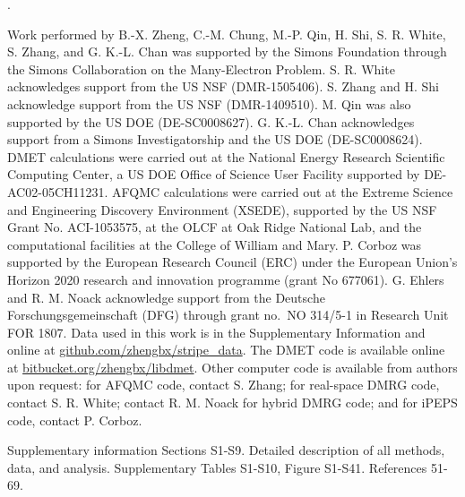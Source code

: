 \documentclass[12pt]{article}
\newcounter{lastnote}
\newenvironment{scilastnote}{%
\setcounter{lastnote}{\value{enumiv}}%
\addtocounter{lastnote}{+1}%
\begin{list}%
{\arabic{lastnote}.}
{\setlength{\leftmargin}{.22in}}
{\setlength{\labelsep}{.5em}}}
{\end{list}}
\begin{document}
\begin{scilastnote}
\item[] Work performed by B.-X. Zheng, C.-M. Chung,
  M.-P. Qin, H. Shi, S. R. White, 
  S. Zhang, and G. K.-L. Chan was supported by the Simons Foundation through the Simons Collaboration
  on the Many-Electron Problem. S. R. White acknowledges support from the US NSF (DMR-1505406).
  S. Zhang and H. Shi acknowledge support from the US NSF (DMR-1409510). M. Qin was also supported by the US DOE (DE-SC0008627).
  G. K.-L. Chan acknowledges support from a Simons Investigatorship and the US DOE (DE-SC0008624).
  DMET calculations were carried out at the National Energy Research Scientific Computing Center, a US DOE Office of Science User Facility   supported by DE-AC02-05CH11231.   AFQMC calculations were carried out at the Extreme Science and
  Engineering Discovery Environment (XSEDE), 
  supported by the US NSF Grant No. ACI-1053575, at the OLCF at Oak Ridge National Lab, and the computational facilities at the
  College of William and Mary. P. Corboz was supported by the European Research Council (ERC) under the
  European Union's Horizon 2020 research and innovation programme (grant No 
  677061).
  G. Ehlers and R. M. Noack acknowledge support
  from the Deutsche Forschungsgemeinschaft (DFG) through grant
  no.\  NO 314/5-1 in Research Unit FOR 1807. Data used in this work is in the Supplementary Information and online at \url{github.com/zhengbx/stripe_data}.
  The DMET code is available online at \url{bitbucket.org/zhengbx/libdmet}. Other computer code is available from authors upon request: for AFQMC code, contact
  S. Zhang; for real-space DMRG code, contact S. R. White; contact R. M. Noack for hybrid DMRG code; and for iPEPS code, contact P. Corboz.
\end{scilastnote}

 \bigskip

 Supplementary information Sections S1-S9. Detailed description
 of all methods, data, and analysis. Supplementary Tables S1-S10, Figure S1-S41. References 51-69.
\end{document}
